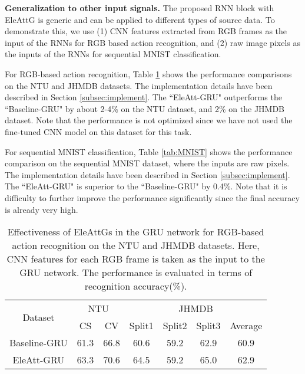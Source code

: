 \documentclass[journal]{IEEEtran}
\newcommand{\EleAttGn}{{EleAttG}}
\begin{document}
\textbf{Generalization to other input signals.} The proposed RNN block with {\EleAttGn} is generic and can be applied to different types of source data. To demonstrate this, we use (1) CNN features extracted from RGB frames as the input of the RNNs for RGB based action recognition, and (2) raw image pixels as the inputs of the RNNs for sequential MNIST classification. 

For RGB-based action recognition, Table \ref{tab:rgb} shows the performance comparisons on the NTU and JHMDB datasets. The implementation details have been described in Section \ref{subsec:implement}. The ``EleAtt-GRU" outperforms the ``Baseline-GRU" by about 2-4\% on the NTU dataset, and 2\% on the JHMDB dataset. Note that the performance is not optimized since we have not used the fine-tuned CNN model on this dataset for this task.

For sequential MNIST classification, Table \ref{tab:MNIST} shows the performance comparison on the sequential MNIST dataset, where the inputs are raw pixels. The implementation details have been described in Section \ref{subsec:implement}. The ``EleAtt-GRU" is superior to the ``Baseline-GRU" by 0.4\%. Note that it is difficulty to further improve the performance significantly since the final accuracy is already very high.

\setlength{\tabcolsep}{7pt}
\begin{table}[t]
	\centering
	\caption{Effectiveness of {\EleAttGn}s in the GRU network for RGB-based action recognition on the NTU and JHMDB datasets. Here, CNN features for each RGB frame is taken as the input to the GRU network. The performance is evaluated in terms of recognition accuracy(\%).}
	\label{tab:rgb}
	\begin{tabular}{ccccccc}
		\toprule
		\multirow{2}{*}{Dataset} & \multicolumn{2}{c}{NTU} & \multicolumn{4}{c}{JHMDB}        \\
		\cmidrule(lr){2-3}
		\cmidrule(lr){4-7}
		& CS         & CV         & Split1 & Split2 & Split3 & Average  \\
		\midrule
		Baseline-GRU                & 61.3      & 66.8      & 60.6  & 59.2  & 62.9  & 60.9 \\
		EleAtt-GRU                    & 63.3      & 70.6      & 64.5  & 59.2  & 65.0  & 62.9 \\
		\bottomrule
	\end{tabular}
\end{table}
\end{document}
